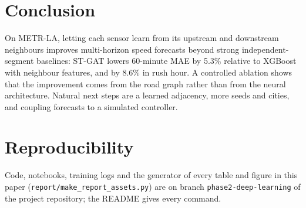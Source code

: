 \documentclass[conference]{IEEEtran}
\begin{document}
\section{Conclusion}
On METR-LA, letting each sensor learn from its upstream and downstream neighbours improves multi-horizon speed forecasts beyond strong independent-segment baselines: ST-GAT lowers 60-minute MAE by 5.3\% relative to XGBoost with neighbour features, and by 8.6\% in rush hour. A controlled ablation shows that the improvement comes from the road graph rather than from the neural architecture. Natural next steps are a learned adjacency, more seeds and cities, and coupling forecasts to a simulated controller.

\section*{Reproducibility}
Code, notebooks, training logs and the generator of every table and figure in this paper (\texttt{report/make\_report\_assets.py}) are on branch \texttt{phase2-deep-learning} of the project repository; the README gives every command.



\end{document}
